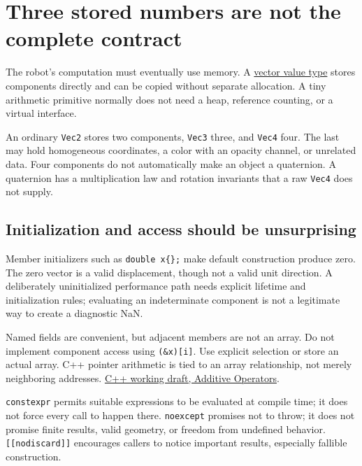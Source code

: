\section{Three stored numbers are not the complete contract}\label{02-foundations-ii-ch037-three-stored-numbers-are-not-the-complete-contract}

The robot's computation must eventually use memory. A \hyperref[02-foundations-ii-ch037-three-stored-numbers-are-not-the-complete-contract]{vector value type} stores components directly and can be copied without separate allocation. A tiny arithmetic primitive normally does not need a heap, reference counting, or a virtual interface.

An ordinary \texttt{Vec2} stores two components, \texttt{Vec3} three, and \texttt{Vec4} four. The last may hold homogeneous coordinates, a color with an opacity channel, or unrelated data. Four components do not automatically make an object a quaternion. A quaternion has a multiplication law and rotation invariants that a raw \texttt{Vec4} does not supply.

\subsection{Initialization and access should be unsurprising}\label{02-foundations-ii-ch037-initialization-and-access-should-be-unsurprising}

Member initializers such as \texttt{double\ x\{\};} make default construction produce zero. The zero vector is a valid displacement, though not a valid unit direction. A deliberately uninitialized performance path needs explicit lifetime and initialization rules; evaluating an indeterminate component is not a legitimate way to create a diagnostic NaN.

Named fields are convenient, but adjacent members are not an array. Do not implement component access using \texttt{(\&x){[}i{]}}. Use explicit selection or store an actual array. C++ pointer arithmetic is tied to an array relationship, not merely neighboring addresses. \href{https://eel.is/c++draft/expr.add}{C++ working draft, Additive Operators}.

\texttt{constexpr} permits suitable expressions to be evaluated at compile time; it does not force every call to happen there. \texttt{noexcept} promises not to throw; it does not promise finite results, valid geometry, or freedom from undefined behavior. \texttt{{[}{[}nodiscard{]}{]}} encourages callers to notice important results, especially fallible construction.

